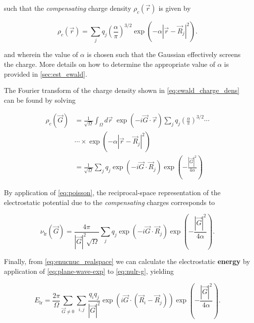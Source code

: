 such that the \textit{compensating} charge density $\rho_{c}(\vec{r})$ is given by

\begin{equation}
    \rho_{c}(\vec{r}) = \sum_{j} q_{j} \left( \frac{\alpha}{\pi} \right)^{3/2} \exp \left(- \alpha \left|\vec{r} - \vec{R}_{j} \right|^{2} \right).
    \label{eq:ewald_charge_dens}
\end{equation}

and wherein the value of $\alpha$ is chosen such that the Gaussian effectively screens the charge. More details on how to determine the appropriate value of $\alpha$ is provided in \cref{sec:est_ewald}.

The Fourier transform of the charge density shown in \cref{eq:ewald_charge_dens} can be found by solving

\begin{align}
    \rho_{c}(\vec{G}) &= \frac{1}{\sqrt{\Omega}}\int_{\Omega} d\vec{r} \; \exp\left(-i\vec{G} \cdot \vec{r} \right) \sum_{j} q_{j} \left( \frac{\alpha}{\pi} \right)^{3/2} \cdots \nonumber \\
    & \cdots \times \exp \left(- \alpha \left|\vec{r} - \vec{R}_{j} \right|^{2} \right) \\
    &= \frac{1}{\sqrt{\Omega}} \sum_{j} q_{j} \exp \left(-i \vec{G} \cdot \vec{R}_{j} \right) \exp \left(- \frac{|\vec{G}|^{2}}{4 \alpha} \right)
\end{align}

By application of \cref{eq:poisson}, the reciprocal-space representation of the electrostatic potential due to the \textit{compensating} charges corresponds to

\begin{equation}
    \nu_{\text{lr}}(\vec{G}) = \frac{4\pi}{|\vec{G}|^{2}\sqrt{\Omega}} \sum_{j} q_{j} \exp \left(-i \vec{G} \cdot \vec{R}_{j} \right) \exp \left(- \frac{|\vec{G}|^{2}}{4 \alpha} \right).
    \label{eq:nulr-g}
\end{equation}

Finally, from \cref{eq:enucnuc_realspace} we can calculate the electrostatic \textbf{energy} by application of \cref{eq:plane-wave-exp} to \cref{eq:nulr-g}, yielding

\begin{equation}
    E_{\text{lr}} = \frac{2 \pi}{\Omega} \sum_{\vec{G} \neq 0} \sum_{i,j} \frac{q_{i}q_{j}}{|\vec{G}|^{2}} \exp \left(i \vec{G} \cdot \left(\vec{R}_{i} - \vec{R}_{j} \right) \right) \exp \left(- \frac{|\vec{G}|^{2}}{4 \alpha} \right). \label{eq:long-range}
\end{equation}

